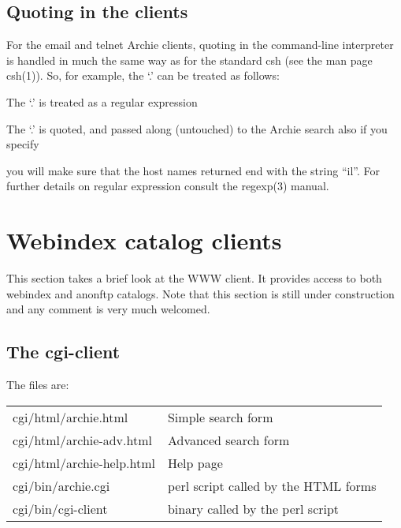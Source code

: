 \subsection{Quoting in the clients}

For the email and telnet Archie clients, quoting in the command-line
interpreter is handled in much the same way as for the standard csh (see the
man page csh(1)). So, for example, the `.' can be treated as follows:




The `.' is treated as a regular expression


The `.' is quoted, and passed along (untouched) to the Archie search also if
you specify


you will make sure that the host names returned end with the string ``il''.
For further details on regular expression consult the regexp(3) manual.





\section{Webindex catalog clients} 


This section takes a brief look at the WWW client. It provides access to both
webindex and anonftp catalogs.  Note that this section is still under
construction and any comment is very much welcomed. \new


\subsection{The cgi-client}
\label{sec:cgiclient}

The files are:

\begin{tabular}{ll}

cgi/html/archie.html      & Simple search form \\

cgi/html/archie-adv.html  & Advanced search form \\

cgi/html/archie-help.html & Help page \\

cgi/bin/archie.cgi & perl script called by the HTML forms \\ 

cgi/bin/cgi-client & binary called by the perl script \\

\end{tabular}



